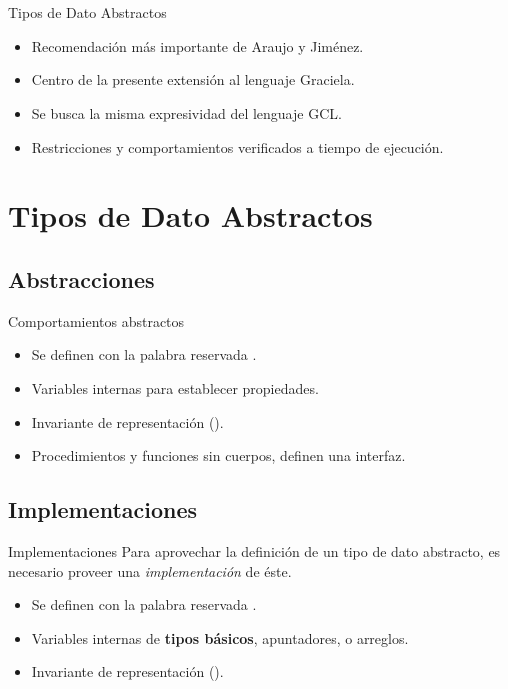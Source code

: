 \section*{ }

\begin{frame}{Tipos de Dato Abstractos}

\begin{itemize}
  \item Recomendación más importante de Araujo y Jiménez.
  \item Centro de la presente extensión al lenguaje Graciela.
  \item Se busca la misma expresividad del lenguaje GCL.
  \item Restricciones y comportamientos verificados a tiempo de ejecución.
\end{itemize}
\end{frame}

\section{Tipos de Dato Abstractos}

\subsection*{Abstracciones}

\begin{frame}{Comportamientos abstractos}
\begin{itemize}
  \item Se definen con la palabra reservada .
  \item Variables internas para establecer propiedades.
  \item Invariante de representación ().
  \item Procedimientos y funciones sin cuerpos, definen una interfaz.
\end{itemize}
\end{frame}

\subsection*{Implementaciones}
\begin{frame}{Implementaciones}
Para aprovechar la definición de un tipo de dato abstracto, es necesario proveer una \textit{implementación} de éste.
\begin{itemize}
  \item Se definen con la palabra reservada .
  \item Variables internas de \textbf{tipos básicos}, apuntadores, o arreglos.
  \item Invariante de representación ().
\end{itemize}
\end{frame}

